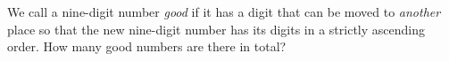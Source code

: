 \problem
We call a nine-digit number \emph{good} if it has a digit that can be moved to \emph{another} place so that the new nine-digit number has its digits in a strictly ascending order. 
How many good numbers are there in total?
\solution
\endproblem

